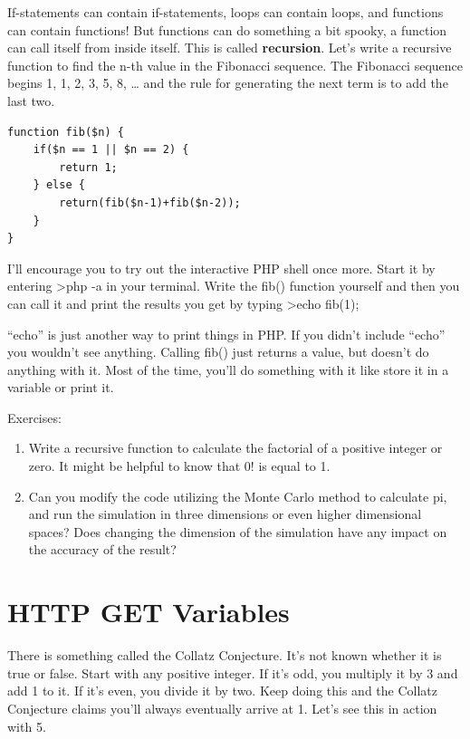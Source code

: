 \documentclass[
]{book}
\begin{document}
If-statements can contain if-statements, loops can contain loops, and functions can contain functions! But functions can do something a bit spooky, a function can call itself from inside itself. This is called \textbf{recursion}. Let's write a recursive function to find the n-th value in the Fibonacci sequence. The Fibonacci sequence begins 1, 1, 2, 3, 5, 8, \ldots{} and the rule for generating the next term is to add the last two.

\begin{verbatim}
function fib($n) {
    if($n == 1 || $n == 2) {
        return 1;
    } else {
        return(fib($n-1)+fib($n-2));
    }
}
\end{verbatim}

I'll encourage you to try out the interactive PHP shell once more. Start it by entering \textgreater php -a in your terminal. Write the fib() function yourself and then you can call it and print the results you get by typing \textgreater echo fib(1);

``echo'' is just another way to print things in PHP. If you didn't include ``echo'' you wouldn't see anything. Calling fib() just returns a value, but doesn't do anything with it. Most of the time, you'll do something with it like store it in a variable or print it.

Exercises:

\begin{enumerate}
\def\labelenumi{\arabic{enumi}.}
\item
  Write a recursive function to calculate the factorial of a positive integer or zero. It might be helpful to know that 0! is equal to 1.
\item
  Can you modify the code utilizing the Monte Carlo method to calculate pi, and run the simulation in three dimensions or even higher dimensional spaces? Does changing the dimension of the simulation have any impact on the accuracy of the result?
\end{enumerate}

\hypertarget{GET}{%
\chapter{HTTP GET Variables}\label{GET}}

There is something called the Collatz Conjecture. It's not known whether it is true or false. Start with any positive integer. If it's odd, you multiply it by 3 and add 1 to it. If it's even, you divide it by two. Keep doing this and the Collatz Conjecture claims you'll always eventually arrive at 1. Let's see this in action with 5.
\end{document}
